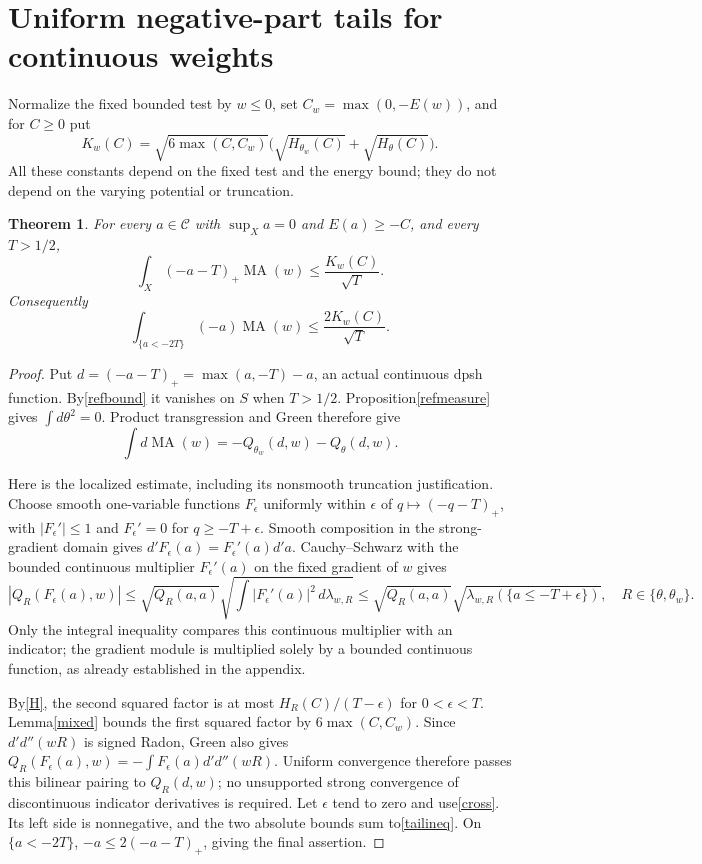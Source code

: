 \documentclass[11pt]{article}
\newcommand{\DD}{d'd''}
\newcommand{\MA}{\operatorname{MA}}
\newcommand{\C}{\mathcal C}
\newtheorem{theorem}{Theorem}
\theoremstyle{remark}\newtheorem{remark}[theorem]{Remark}
\begin{document}
\section{Uniform negative-part tails for continuous weights}
Normalize the fixed bounded test by $w\le0$, set
$C_w=\max(0,-E(w))$, and for $C\ge0$ put
\[
 K_w(C)=\sqrt{6\max(C,C_w)}
       \bigl(\sqrt{H_{\theta_w}(C)}+\sqrt{H_\theta(C)}\bigr).
\]
All these constants depend on the fixed test and the energy
bound; they do not depend on the varying potential or truncation.

\begin{theorem}\label{tailC}
For every $a\in\C$ with $\sup_Xa=0$ and $E(a)\ge-C$, and
every $T>1/2$,
\begin{equation}\label{tailineq}
 \int_X(-a-T)_+\MA(w)\le\frac{K_w(C)}{\sqrt T}.
\end{equation}
Consequently
\[
 \int_{\{a<-2T\}}(-a)\MA(w)\le\frac{2K_w(C)}{\sqrt T}.
\]
\end{theorem}
\begin{proof}
Put $d=(-a-T)_+=\max(a,-T)-a$, an actual continuous dpsh
function. By\eqref{refbound} it vanishes on $S$ when $T>1/2$.
Proposition\ref{refmeasure} gives $\int d\theta^2=0$.
Product transgression and Green therefore give
\begin{equation}\label{cross}
 \int d\MA(w)=-Q_{\theta_w}(d,w)-Q_\theta(d,w).
\end{equation}

Here is the localized estimate, including its nonsmooth
truncation justification. Choose smooth one-variable functions
$F_\epsilon$ uniformly within $\epsilon$ of
$q\mapsto(-q-T)_+$, with $|F_\epsilon'|\le1$ and
$F_\epsilon'=0$ for $q\ge-T+\epsilon$. Smooth composition
in the strong-gradient domain gives
$d'F_\epsilon(a)=F_\epsilon'(a)d'a$.
Cauchy--Schwarz with the bounded continuous multiplier
$F_\epsilon'(a)$ on the fixed gradient of $w$ gives
\[
 |Q_R(F_\epsilon(a),w)|\le
 \sqrt{Q_R(a,a)}
 \sqrt{\int|F_\epsilon'(a)|^2\,d\lambda_{w,R}}
 \le\sqrt{Q_R(a,a)}
 \sqrt{\lambda_{w,R}(\{a\le-T+\epsilon\})},
 \quad R\in\{\theta,\theta_w\}.
\]
Only the integral inequality compares this continuous multiplier
with an indicator; the gradient module is multiplied solely by
a bounded continuous function, as already established in the
appendix.

By\eqref{H}, the second squared factor is at most
$H_R(C)/(T-\epsilon)$ for $0<\epsilon<T$.
Lemma\ref{mixed} bounds the first squared factor by
$6\max(C,C_w)$. Since $\DD(wR)$ is signed Radon, Green
also gives
$Q_R(F_\epsilon(a),w)=-\int F_\epsilon(a)\DD(wR)$.
Uniform convergence therefore passes this bilinear pairing to
$Q_R(d,w)$; no unsupported strong convergence of discontinuous
indicator derivatives is required. Let $\epsilon$ tend to zero
and use\eqref{cross}. Its left side is nonnegative, and the two
absolute bounds sum to\eqref{tailineq}. On $\{a<-2T\}$,
$-a\le2(-a-T)_+$, giving the final assertion.
\end{proof}
\end{document}
